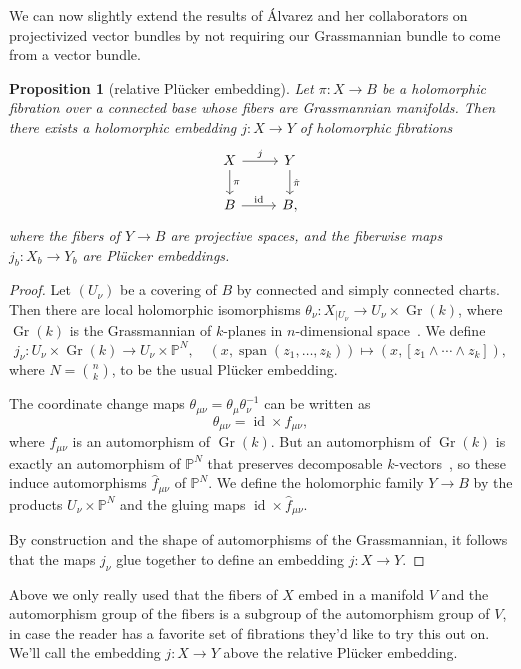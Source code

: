 \documentclass[10pt,a4paper]{amsart}
\newtheorem{prop}[theo]{Proposition}
\theoremstyle{definition}
\newcommand{\kk}[1]{\mathbb{#1}}
\DeclareMathOperator{\Span}{span}
\DeclareMathOperator{\Gr}{Gr}
\DeclareMathOperator{\id}{id}
\begin{document}
We can now slightly extend the results of \'Alvarez and her collaborators on projectivized vector bundles by not requiring our Grassmannian bundle to come from a vector bundle.







\begin{prop}[relative Pl\"ucker embedding]
Let $\pi : X \to B$ be a holomorphic fibration over a connected base whose fibers are Grassmannian manifolds.
Then there exists a holomorphic embedding $j : X \to Y$ of holomorphic fibrations
\[
\begin{tikzcd}
  X \ar[d,"\pi"] \ar[r,"j"] & Y \ar[d,"\hat\pi"]
  \\
  B \ar[r,"\id"] & B,
\end{tikzcd}
\]
where the fibers of $Y \to B$ are projective spaces, and the fiberwise maps $j_{b} : X_{b} \to Y_{b}$ are Pl\"ucker embeddings.
\end{prop}


\begin{proof}
Let $(U_{\nu})$ be a covering of $B$ by connected and simply connected charts.
Then there are local holomorphic isomorphisms $\theta_{\nu} : X_{|U_{\nu}} \to U_{\nu} \times \Gr(k)$, where $\Gr(k)$ is the Grassmannian of $k$-planes in $n$-dimensional space~\cite{fischer1965lokal}.
We define
\[
  j_{\nu} : U_{\nu} \times \Gr(k) \to U_{\nu} \times \kk P^{N},
  \quad
  (x, \Span(z_{1}, \ldots, z_{k}))
  \mapsto
  (x, [z_{1} \wedge \cdots \wedge z_{k}]),
\]
where $N = \binom nk$,
to be the usual Pl\"ucker embedding.

The coordinate change maps $\theta_{\mu\nu} = \theta_{\mu}\theta_{\nu}^{-1}$ can be written as
\[
\theta_{\mu\nu} = \id \times f_{\mu\nu},
\]
where $f_{\mu\nu}$ is an automorphism of $\Gr(k)$.
But an automorphism of $\Gr(k)$ is exactly an automorphism of $\kk P^{N}$ that preserves decomposable $k$-vectors~\cite{cowen1989automorphisms}, so these induce automorphisms $\hat f_{\mu\nu}$ of $\kk P^{N}$. We define the holomorphic family $Y \to B$ by the products $U_{\nu} \times \kk P^{N}$ and the gluing maps $\id \times \hat f_{\mu\nu}$.

By construction and the shape of automorphisms of the Grassmannian, it follows that the maps $j_{\nu}$ glue together to define an embedding $j : X \to Y$.
\end{proof}

Above we only really used that the fibers of $X$ embed in a manifold $V$ and the automorphism group of the fibers is a subgroup of the automorphism group of $V$, in case the reader has a favorite set of fibrations they'd like to try this out on.
We'll call the embedding $j : X \to Y$ above the relative Pl\"ucker embedding.
\end{document}

